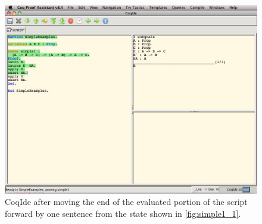 \documentclass[11pt]{amsart}
\begin{document}
\begin{figure}
  \center
  \includegraphics[width=\linewidth]{simple1_2.jpg}
  \caption{CoqIde after moving the end of the evaluated portion of the script forward by one sentence from the state shown in \autoref{fig:simple1_1}.}
  \label{fig:simple1_2}
\end{figure}
\end{document}
